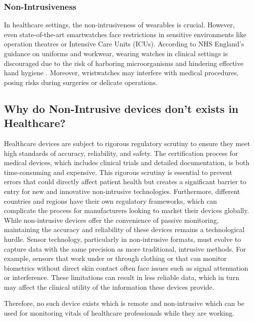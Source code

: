 \subsubsection{Non-Intrusiveness}

In healthcare settings, the non-intrusiveness of wearables is crucial. However, even state-of-the-art smartwatches face restrictions in sensitive environments like operation theatres or Intensive Care Units (ICUs). According to NHS England's guidance on uniforms and workwear, wearing watches in clinical settings is discouraged due to the risk of harboring microorganisms and hindering effective hand hygiene \cite{ref20}. Moreover, wristwatches may interfere with medical procedures, posing risks during surgeries or delicate operations.

\subsection{Why do Non-Intrusive devices don't exists in Healthcare?}
Healthcare devices are subject to rigorous regulatory scrutiny to ensure they meet high standards of accuracy, reliability, and safety. The certification process for medical devices, which includes clinical trials and detailed documentation, is both time-consuming and expensive. This rigorous scrutiny is essential to prevent errors that could directly affect patient health but creates a significant barrier to entry for new and innovative non-intrusive technologies. Furthermore, different countries and regions have their own regulatory frameworks, which can complicate the process for manufacturers looking to market their devices globally.\\

While non-intrusive devices offer the convenience of passive monitoring, maintaining the accuracy and reliability of these devices remains a technological hurdle. Sensor technology, particularly in non-intrusive formats, must evolve to capture data with the same precision as more traditional, intrusive methods. For example, sensors that work under or through clothing or that can monitor biometrics without direct skin contact often face issues such as signal attenuation or interference. These limitations can result in less reliable data, which in turn may affect the clinical utility of the information these devices provide.


\noindent Therefore, no such device exists which is remote and non-intrusive which can be used for monitoring vitals of healthcare professionals while they are working.


